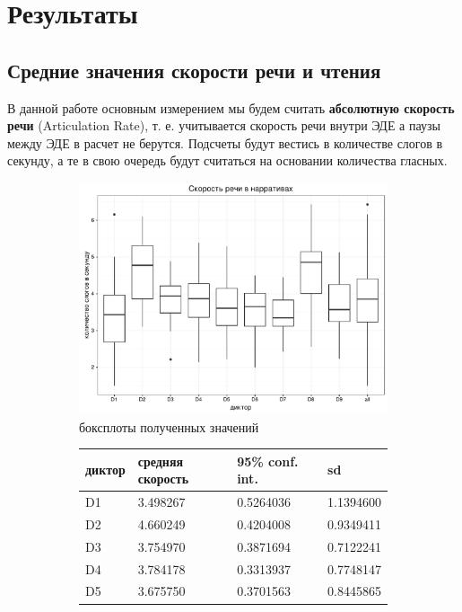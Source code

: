 \section{Результаты}
\subsection{Средние значения скорости речи и чтения}
\noindent В данной работе основным измерением мы будем считать \textbf{абсолютную скорость речи} (Articulation Rate), т. е. учитывается скорость речи внутри ЭДЕ а паузы между ЭДЕ в расчет не берутся. Подсчеты будут вестись в количестве слогов в секунду, а те в свою очередь будут считаться на основании количества гласных.
\begin{figure}[t]
\begin{subfigure}[b]{0.53\textwidth}
        \includegraphics[width=\linewidth]{narrativeboxplot.pdf}
        \caption{боксплоты полученных значений}
\end{subfigure}
\hfill
\begin{subfigure}[b]{0.45\textwidth}
\small
\begin{tabular}{|l|l|l|l|}
\hline
диктор & средняя скорость & 95\% conf. int. & sd \\ \hline
D1 & 3.498267 & 0.5264036 & 1.1394600 \\ \hline
D2 & 4.660249 & 0.4204008 & 0.9349411 \\ \hline
D3 & 3.754970 & 0.3871694 & 0.7122241 \\ \hline
D4 & 3.784178 & 0.3313937 & 0.7748147 \\ \hline
D5 & 3.675750 & 0.3701563 & 0.8445865 \\ \hline

\end{tabular}
\end{subfigure}
\end{figure}
